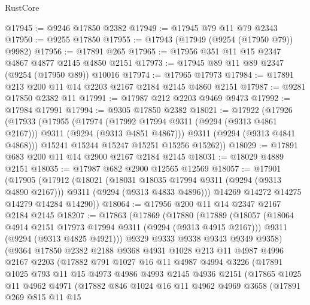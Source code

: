 \begin{lexlean}{RustCore}
\begin{coremodule}
@17945 := @9246 @17850 @2382
@17949 := @17945 @79 @11 @79 @2343
@17950 := @9255 @17850
@17955 := @17943 (@17949 (@9254 (@17950 @79)) @9982)
@17956 := @17891 @265
@17965 := @17956 @351 @11 @15 @2347 @4867 @4877 @2145 @4850 @2151
@17973 := @17945 @89 @11 @89 @2347 (@9254 (@17950 @89)) @10016
@17974 := @17965 @17973
@17984 := @17891 @213 @200 @11 @14 @2203 @2167 @2184 @2145 @4860 @2151
@17987 := @9281 @17850 @2382 @11
@17991 := @17987 @212 @2203 @9469 @9473
@17992 := @17984 @17991
@17994 := @9305 @17850 @2382
@18021 := @17922
    (@17926
      (@17933
        (@17955
          (@17974
            (@17992 @17994 @9311 (@9294 (@9313 @4861 @2167)))
            @9311
            (@9294 (@9313 @4851 @4867)))
          @9311
          (@9294 (@9313 @4841 @4868)))
        @15241
        @15244
        @15247
        @15251
        @15256
        @15262))
@18029 := @17891 @683 @200 @11 @14 @2900 @2167 @2184 @2145
@18031 := @18029 @4889 @2151
@18035 := @17987 @682 @2900 @12565 @12569
@18057 := @17901
    (@17905
      (@17912
        (@18021
          (@18031 @18035 @17994 @9311 (@9294 (@9313 @4890 @2167)))
          @9311
          (@9294 (@9313 @4833 @4896)))
        @14269
        @14272
        @14275
        @14279
        @14284
        @14290))
@18064 := @17956 @200 @11 @14 @2347 @2167 @2184 @2145
@18207 := @17863
    (@17869
      (@17880
        (@17889
          (@18057
            (@18064 @4914 @2151 @17973 @17994 @9311 (@9294 (@9313 @4915 @2167)))
            @9311
            (@9294 (@9313 @4825 @4921)))
          @9329
          @9333
          @9338
          @9343
          @9349
          @9358)
        (@9364
          @17850
          @2382
          @2188
          @9368
          @4931
          @1028
          @213
          @11
          @4987
          @4996
          @2167
          @2203
          (@17882
            @791
            @1027
            @16
            @11
            @4987
            @4994
            @3226
            (@17891
              @1025
              @793
              @11
              @15
              @4973
              @4986
              @4993
              @2145
              @4936
              @2151
              (@17865
                @1025
                @11
                @4962
                @4971
                (@17882
                  @846
                  @1024
                  @16
                  @11
                  @4962
                  @4969
                  @3658
                  (@17891
                    @269
                    @815
                    @11
                    @15

\end{coremodule}
\end{lexlean}
